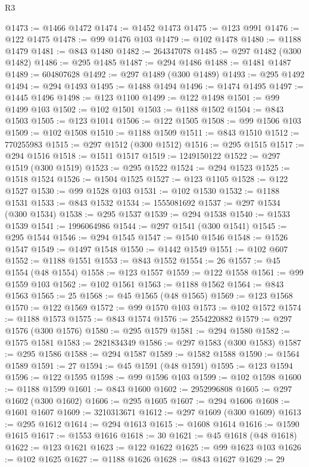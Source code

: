 \begin{lexlean}{R3}
\begin{coremodule}
@1473 := @1466 @1472
@1474 := @1452 @1473
@1475 := @123 @991
@1476 := @122 @1475
@1478 := @99 @1476 @103
@1479 := @102 @1478
@1480 := @1188 @1479
@1481 := @843 @1480
@1482 := 264347078
@1485 := @297 @1482 (@300 @1482)
@1486 := @295 @1485
@1487 := @294 @1486
@1488 := @1481 @1487
@1489 := 604807628
@1492 := @297 @1489 (@300 @1489)
@1493 := @295 @1492
@1494 := @294 @1493
@1495 := @1488 @1494
@1496 := @1474 @1495
@1497 := @1445 @1496
@1498 := @123 @1100
@1499 := @122 @1498
@1501 := @99 @1499 @103
@1502 := @102 @1501
@1503 := @1188 @1502
@1504 := @843 @1503
@1505 := @123 @1014
@1506 := @122 @1505
@1508 := @99 @1506 @103
@1509 := @102 @1508
@1510 := @1188 @1509
@1511 := @843 @1510
@1512 := 770255983
@1515 := @297 @1512 (@300 @1512)
@1516 := @295 @1515
@1517 := @294 @1516
@1518 := @1511 @1517
@1519 := 1249150122
@1522 := @297 @1519 (@300 @1519)
@1523 := @295 @1522
@1524 := @294 @1523
@1525 := @1518 @1524
@1526 := @1504 @1525
@1527 := @123 @1105
@1528 := @122 @1527
@1530 := @99 @1528 @103
@1531 := @102 @1530
@1532 := @1188 @1531
@1533 := @843 @1532
@1534 := 1555081692
@1537 := @297 @1534 (@300 @1534)
@1538 := @295 @1537
@1539 := @294 @1538
@1540 := @1533 @1539
@1541 := 1996064986
@1544 := @297 @1541 (@300 @1541)
@1545 := @295 @1544
@1546 := @294 @1545
@1547 := @1540 @1546
@1548 := @1526 @1547
@1549 := @1497 @1548
@1550 := @1442 @1549
@1551 := @102 @607
@1552 := @1188 @1551
@1553 := @843 @1552
@1554 := 26
@1557 := @45 @1554 (@48 @1554)
@1558 := @123 @1557
@1559 := @122 @1558
@1561 := @99 @1559 @103
@1562 := @102 @1561
@1563 := @1188 @1562
@1564 := @843 @1563
@1565 := 25
@1568 := @45 @1565 (@48 @1565)
@1569 := @123 @1568
@1570 := @122 @1569
@1572 := @99 @1570 @103
@1573 := @102 @1572
@1574 := @1188 @1573
@1575 := @843 @1574
@1576 := 2554220882
@1579 := @297 @1576 (@300 @1576)
@1580 := @295 @1579
@1581 := @294 @1580
@1582 := @1575 @1581
@1583 := 2821834349
@1586 := @297 @1583 (@300 @1583)
@1587 := @295 @1586
@1588 := @294 @1587
@1589 := @1582 @1588
@1590 := @1564 @1589
@1591 := 27
@1594 := @45 @1591 (@48 @1591)
@1595 := @123 @1594
@1596 := @122 @1595
@1598 := @99 @1596 @103
@1599 := @102 @1598
@1600 := @1188 @1599
@1601 := @843 @1600
@1602 := 2952996808
@1605 := @297 @1602 (@300 @1602)
@1606 := @295 @1605
@1607 := @294 @1606
@1608 := @1601 @1607
@1609 := 3210313671
@1612 := @297 @1609 (@300 @1609)
@1613 := @295 @1612
@1614 := @294 @1613
@1615 := @1608 @1614
@1616 := @1590 @1615
@1617 := @1553 @1616
@1618 := 30
@1621 := @45 @1618 (@48 @1618)
@1622 := @123 @1621
@1623 := @122 @1622
@1625 := @99 @1623 @103
@1626 := @102 @1625
@1627 := @1188 @1626
@1628 := @843 @1627
@1629 := 29

\end{coremodule}
\end{lexlean}
